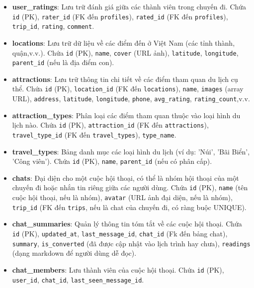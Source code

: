 \begin{itemize}
    \item \textbf{user\_ratings}: Lưu trữ đánh giá giữa các thành viên trong chuyến đi. Chứa \texttt{id} (PK), \texttt{rater\_id} (FK đến \texttt{profiles}), \texttt{rated\_id} (FK đến \texttt{profiles}), \texttt{trip\_id}, \texttt{rating}, \texttt{comment}.

    \item \textbf{locations}: Lưu trữ dữ liệu về các điểm đến ở Việt Nam (các tỉnh thành, quận,v.v.). Chứa \texttt{id} (PK), \texttt{name}, \texttt{cover} (URL ảnh), \texttt{latitude}, \texttt{longitude}, \texttt{parent\_id} (nếu là địa điểm con).

    \item \textbf{attractions}: Lưu trữ thông tin chi tiết về các điểm tham quan du lịch cụ thể. Chứa \texttt{id} (PK), \texttt{location\_id} (FK đến \texttt{locations}), \texttt{name}, \texttt{images} (array URL), \texttt{address}, \texttt{latitude}, \texttt{longitude}, \texttt{phone}, \texttt{avg\_rating}, \texttt{rating\_count},v.v.

    \item \textbf{attraction\_types}: Phân loại các điểm tham quan thuộc vào loại hình du lịch nào. Chứa \texttt{id} (PK), \texttt{attraction\_id} (FK đến \texttt{attractions}), \texttt{travel\_type\_id} (FK đến \texttt{travel\_types}), \texttt{type\_name}.

    \item \textbf{travel\_types}: Bảng danh mục các loại hình du lịch (ví dụ: 'Núi', 'Bãi Biển', 'Công viên'). Chứa \texttt{id} (PK), \texttt{name}, \texttt{parent\_id} (nếu có phân cấp).

    \item \textbf{chats}: Đại diện cho một cuộc hội thoại, có thể là nhóm hội thoại của một chuyến đi hoặc nhắn tin riêng giữa các người dùng. Chứa \texttt{id} (PK), \texttt{name} (tên cuộc hội thoại, nếu là nhóm), \texttt{avatar} (URL ảnh đại diện, nếu là nhóm), \texttt{trip\_id} (FK đến \texttt{trips}, nếu là chat của chuyến đi, có ràng buộc UNIQUE).
    
    \item \textbf{chat\_summaries}: Quản lý thông tin tóm tắt về các cuộc hội thoại. Chứa \texttt{id} (PK), \texttt{updated\_at}, \texttt{last\_message\_id}, \texttt{chat\_id} (Fk đến bảng chat), \texttt{summary}, \texttt{is\_converted} (đã được cập nhật vào lịch trình hay chưa), \texttt{readings} (dạng markdown để người dùng dễ đọc).

    \item \textbf{chat\_members}: Lưu thành viên của cuộc hội thoại. Chứa \texttt{id} (PK), \texttt{user\_id}, \texttt{chat\_id}, \texttt{last\_seen\_message\_id}.


\end{itemize}
